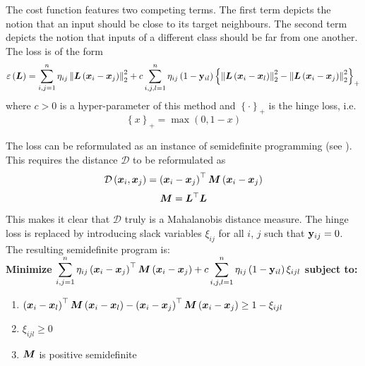 The cost function features two competing terms. The first term depicts the notion that an input should be close to its target neighbours. The second term depicts the notion that inputs of a different class should be far from one another. The loss is of the form
\[ \varepsilon \left( \bm{L} \right) = \sum_{i, j = 1}^n \mathbf{\eta}_{ij} \left\lVert \bm{L} \left( \bm{x}_i - \bm{x}_j \right) \right\rVert_2^2 + c \sum_{i, j, l = 1}^n \mathbf{\eta}_{ij} \left( 1 - \mathbf{y}_{il} \right) \left\{ \left\lVert \bm{L} \left( \bm{x}_i - \bm{x}_l \right) \right\rVert_2^2 - \left\lVert \bm{L} \left( \bm{x}_i - \bm{x}_j \right) \right\rVert_2^2 \right\}_+ \]
where \( c > 0 \) is a hyper-parameter of this method and \( \left\{ \cdot \right\}_+ \) is the hinge loss, i.e.
\[ \left\{ x \right\}_+ = \max \left( 0, 1 - x \right) \]

The loss can be reformulated as an instance of semidefinite programming (see \cite{vandenberghe_semidefinite_1996}). This requires the distance \( \mathcal{D} \) to be reformulated as
\[ \mathcal{D} \left( \bm{x}_i, \bm{x}_j \right) = \left( \bm{x}_i - \bm{x}_j \right)^\top \bm{M} \left( \bm{x}_i - \bm{x}_j \right) \]
\[ \bm{M} = \bm{L}^\top \bm{L} \]
This makes it clear that \( \mathcal{D} \) truly is a Mahalanobis distance measure. The hinge loss is replaced by introducing slack variables \( \xi_{ij} \) for all \( i \), \( j \) such that \( \mathbf{y}_{ij} = 0 \). The resulting semidefinite program is: \\

\noindent \textbf{Minimize} \( \displaystyle \sum_{i, j = 1}^n \mathbf{\eta}_{ij} \left( \bm{x}_i - \bm{x}_j \right)^\top \bm{M} \left( \bm{x}_i - \bm{x}_j \right) + c \sum_{i, j, l = 1}^n \mathbf{\eta}_{ij} \left( 1 - \mathbf{y}_{il} \right) \xi_{ijl} \) \textbf{subject to:}
\begin{enumerate}[\textbf{(\theenumi)}]
  \item \( \displaystyle \left( \bm{x}_i - \bm{x}_l \right)^\top \bm{M} \left( \bm{x}_i - \bm{x}_l \right) - \left( \bm{x}_i - \bm{x}_j \right)^\top \bm{M} \left( \bm{x}_i - \bm{x}_j \right) \geq 1 - \xi_{ijl} \)
  \item \( \displaystyle \xi_{ijl} \geq 0 \)
  \item \( \displaystyle \bm{M} \) is positive semidefinite
\end{enumerate}

